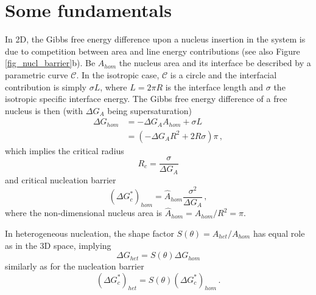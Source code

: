 \section{Some fundamentals}
In 2D, the Gibbs free energy difference upon a nucleus insertion in the system is due to competition between area and line energy contributions (see also Figure \ref{fig_nucl_barrier}b). Be $A_{hom}$ the nucleus area and its interface be described by a parametric curve $\mathcal{C}$. In the isotropic case, $\mathcal{C}$ is a circle and the interfacial contribution is simply $\sigma L$, where $L=2\pi R$ is the interface length and $\sigma$ the isotropic specific interface energy. The Gibbs free energy difference of a free nucleus is then (with $\Delta G_A$ being supersaturation)
\begin{align}
	\Delta G_{hom} &= -\Delta G_A A_{hom} + \sigma L \\
	&= (-\Delta G_A R^2 + 2R\sigma)\pi \,,
\end{align}
which implies the critical radius
\begin{equation} \label{eq_crit_radius_2D}
	R_c = \frac{\sigma}{\Delta G_A}
\end{equation}
and critical nucleation barrier
\begin{equation} 
	(\Delta G_c^*)_{hom} = \hat{A}_{hom}\frac{\sigma^2}{\Delta G_A}\,,
\end{equation}
where the non-dimensional nucleus area is $\hat{A}_{hom}=A_{hom}/R^2=\pi$.

In heterogeneous nucleation, the shape factor $S(\theta)=A_{het}/A_{hom}$ has equal role as in the 3D space, implying
\begin{equation}\label{eq_DG_het_2D}
	\Delta G_{het} = S(\theta)\Delta G_{hom}
\end{equation}
similarly as for the nucleation barrier
\begin{equation}\label{eq_nucl_barr_het_2D}
	(\Delta G_c^*)_{het} = S(\theta)(\Delta G_c^*)_{hom}\,.
\end{equation}

